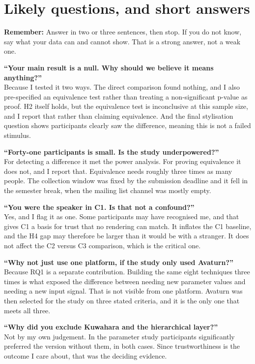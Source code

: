 \documentclass[11pt,a4paper]{article}
\newcommand{\remind}[1]{%
  \vspace{0.15em}
  \noindent\colorbox{knlight}{\parbox{0.972\textwidth}{\small\color{knblue}\textbf{Remember:} #1}}
  \vspace{0.2em}\par}
\begin{document}
\section*{\color{knblue}Likely questions, and short answers}

\remind{Answer in two or three sentences, then stop. If you do not know, say what your data can and cannot show. That is a strong answer, not a weak one.}

\textbf{``Your main result is a null. Why should we believe it means anything?''}\\
Because I tested it two ways. The direct comparison found nothing, and I also pre-specified an equivalence test rather than treating a non-significant p-value as proof. H2 itself holds, but the equivalence test is inconclusive at this sample size, and I report that rather than claiming equivalence. And the final stylisation question shows participants clearly saw the difference, meaning this is not a failed stimulus.

\textbf{``Forty-one participants is small. Is the study underpowered?''}\\
For detecting a difference it met the power analysis. For proving equivalence it does not, and I report that. Equivalence needs roughly three times as many people. The collection window was fixed by the submission deadline and it fell in the semester break, when the mailing list channel was mostly empty.

\textbf{``You were the speaker in C1. Is that not a confound?''}\\
Yes, and I flag it as one. Some participants may have recognised me, and that gives C1 a basis for trust that no rendering can match. It inflates the C1 baseline, and the H4 gap may therefore be larger than it would be with a stranger. It does not affect the C2 versus C3 comparison, which is the critical one.

\textbf{``Why not just use one platform, if the study only used Avaturn?''}\\
Because RQ1 is a separate contribution. Building the same eight techniques three times is what exposed the difference between needing new parameter values and needing a new input signal. That is not visible from one platform. Avaturn was then selected for the study on three stated criteria, and it is the only one that meets all three.

\textbf{``Why did you exclude Kuwahara and the hierarchical layer?''}\\
Not by my own judgement. In the parameter study participants significantly preferred the version without them, in both cases. Since trustworthiness is the outcome I care about, that was the deciding evidence.
\end{document}
